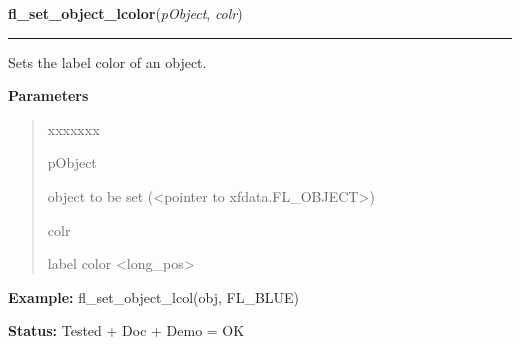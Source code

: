 \hspace{.8\funcindent}\begin{boxedminipage}{\funcwidth}

    \raggedright \textbf{fl\_set\_object\_lcolor}(\textit{pObject}, \textit{colr})

    \vspace{-1.5ex}

    \rule{\textwidth}{0.5\fboxrule}
\setlength{\parskip}{2ex}
    Sets the label color of an object.

\setlength{\parskip}{1ex}
      \textbf{Parameters}
      \vspace{-1ex}

      \begin{quote}
        \begin{Ventry}{xxxxxxx}

          \item[pObject]

          object to be set ({\textless}pointer to 
          xfdata.FL\_OBJECT{\textgreater})

          \item[colr]

          label color {\textless}long\_pos{\textgreater}

        \end{Ventry}

      \end{quote}

\textbf{Example:} fl\_set\_object\_lcol(obj, FL\_BLUE)



\textbf{Status:} Tested + Doc + Demo = OK



    \end{boxedminipage}

    \label{xformslib:library:fl_get_object_lcol}

    \vspace{0.5ex}

